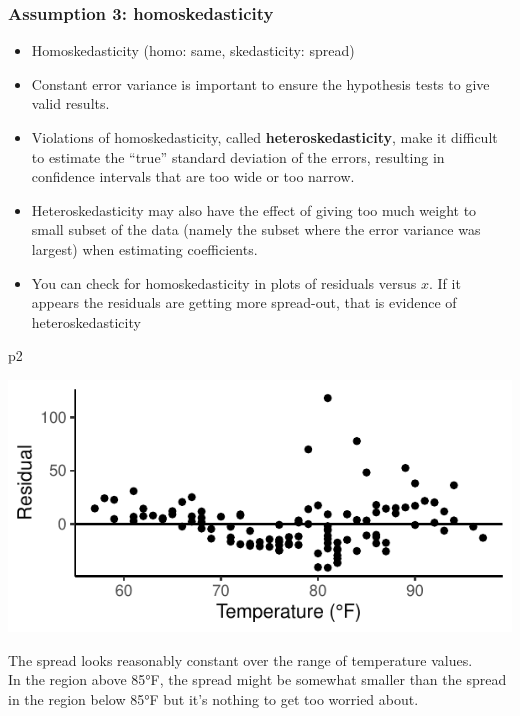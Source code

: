 \documentclass[a4paper]{article}\usepackage[]{graphicx}\usepackage[]{xcolor}
\makeatletter
\def\maxwidth{ %
  \ifdim\Gin@nat@width>\linewidth
    \linewidth
  \else
    \Gin@nat@width
  \fi
}
\makeatother
\begin{document}
\subsubsection{Assumption 3: homoskedasticity}
\begin{itemize}
	\item Homoskedasticity (homo: same, skedasticity: spread)
	\item Constant error variance is important to ensure the hypothesis tests to give valid results.
	\item Violations of homoskedasticity, called \textbf{heteroskedasticity}, make it difficult to estimate the ``true'' standard deviation of the errors, resulting in confidence intervals that are too wide or too narrow.
	\item Heteroskedasticity may also have the effect of giving too much weight to small subset of the data (namely the subset where the error variance was largest) when estimating coefficients.
	\item You can check for homoskedasticity in plots of residuals versus \( x \). If it appears the residuals are getting more spread-out, that is evidence of heteroskedasticity
\end{itemize}
\begin{Schunk}
\begin{Sinput}
p2
\end{Sinput}


{\centering \includegraphics[width=\maxwidth]{figure/listings-unnamed-chunk-351-1} 

}

\end{Schunk}
The spread looks reasonably constant over the range of temperature values.\\
In the region above 85°F, the spread might be somewhat smaller than the spread in the region below 85°F but it's nothing to get too worried about.
\end{document}
